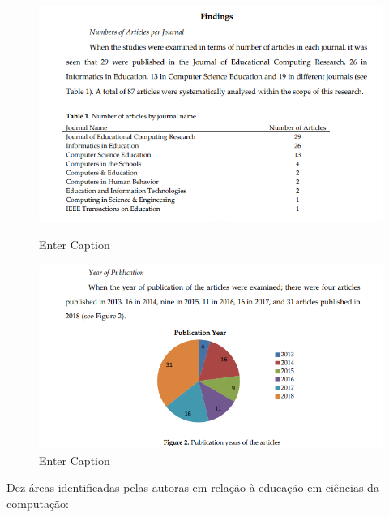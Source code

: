 \begin{figure}
    \centering
    \includegraphics[width=1\linewidth]{qualificacao//figure/reaseach.png}
    \caption{Enter Caption}
    \label{fig:enter-label}

    \centering
    \includegraphics[width=1\linewidth]{qualificacao//figure/cap1-reasech2.png}
    \caption{Enter Caption}
    \label{fig:enter-label}
\end{figure}





 Dez áreas identificadas pelas autoras em relação à educação em ciências da computação:


